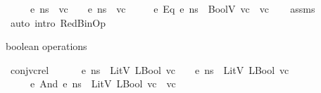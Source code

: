 \begin{isabellebody}
\ \ \ {\isachardoublequoteopen}{\isasymLambda}{\isacharcomma}{\kern0pt}{\isasymGamma}{\isacharcomma}{\kern0pt}{\isasymOmega}\ {\isasymturnstile}\ {\isasymlangle}e{}{\isacharcomma}{\kern0pt}\ ns{\isasymrangle}\ {\isasymDown}\ vc{}{\isachardoublequoteclose}\ \ {\isachardoublequoteopen}{\isasymLambda}{\isacharcomma}{\kern0pt}{\isasymGamma}{\isacharcomma}{\kern0pt}{\isasymOmega}\ {\isasymturnstile}\ {\isasymlangle}e{}{\isacharcomma}{\kern0pt}\ ns{\isasymrangle}\ {\isasymDown}\ vc{}{\isachardoublequoteclose}\isanewline
\ \ \ {\isachardoublequoteopen}{\isasymLambda}{\isacharcomma}{\kern0pt}{\isasymGamma}{\isacharcomma}{\kern0pt}{\isasymOmega}\ {\isasymturnstile}\ {\isasymlangle}e{}\ {\isasymguillemotleft}Eq{\isasymguillemotright}\ e{}{\isacharcomma}{\kern0pt}\ ns{\isasymrangle}\ {\isasymDown}\ BoolV\ {\isacharparenleft}{\kern0pt}vc{}\ {\isacharequal}{\kern0pt}\ vc{}{\isacharparenright}{\kern0pt}{\isachardoublequoteclose}\isanewline
%
\isadelimproof
\ \ %
\endisadelimproof
%
\isatagproof
{}\isamarkupfalse%
\ assms\isanewline
\ \ \isamarkupfalse%
\ {\isacharparenleft}{\kern0pt}auto\ intro{\isacharcolon}{\kern0pt}\ RedBinOp{\isacharparenright}{\kern0pt}%
\endisatagproof
{\isafoldproof}%
%
\isadelimproof
%
\endisadelimproof
%
\begin{isamarkuptext}%
boolean operations%
\end{isamarkuptext}\isamarkuptrue%
\isamarkupfalse%
\ conj{\isacharunderscore}{\kern0pt}vc{\isacharunderscore}{\kern0pt}rel{\isacharcolon}{\kern0pt}\ \isanewline
\ \ \ {\isachardoublequoteopen}{\isasymLambda}{\isacharcomma}{\kern0pt}{\isasymGamma}{\isacharcomma}{\kern0pt}{\isasymOmega}\ {\isasymturnstile}\ {\isasymlangle}e{}{\isacharcomma}{\kern0pt}\ ns{\isasymrangle}\ {\isasymDown}\ LitV\ {\isacharparenleft}{\kern0pt}LBool\ vc{}{\isacharparenright}{\kern0pt}{\isachardoublequoteclose}\ \ {\isachardoublequoteopen}{\isasymLambda}{\isacharcomma}{\kern0pt}{\isasymGamma}{\isacharcomma}{\kern0pt}{\isasymOmega}\ {\isasymturnstile}\ {\isasymlangle}e{}{\isacharcomma}{\kern0pt}\ ns{\isasymrangle}\ {\isasymDown}\ LitV\ {\isacharparenleft}{\kern0pt}LBool\ vc{}{\isacharparenright}{\kern0pt}{\isachardoublequoteclose}\isanewline
\ \ \ {\isachardoublequoteopen}{\isasymLambda}{\isacharcomma}{\kern0pt}{\isasymGamma}{\isacharcomma}{\kern0pt}{\isasymOmega}\ {\isasymturnstile}\ {\isasymlangle}e{}\ {\isasymguillemotleft}And{\isasymguillemotright}\ e{}{\isacharcomma}{\kern0pt}\ ns{\isasymrangle}\ {\isasymDown}\ LitV\ {\isacharparenleft}{\kern0pt}LBool\ {\isacharparenleft}{\kern0pt}vc{}\ {\isasymand}\ vc{}{\isacharparenright}{\kern0pt}{\isacharparenright}{\kern0pt}{\isachardoublequoteclose}\isanewline

\end{isabellebody}
